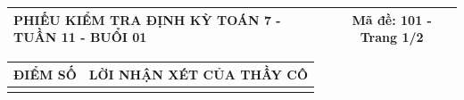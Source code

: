 \documentclass[12pt,a4paper]{article}
\begin{document}
\pagestyle{empty}
\noindent
\begin{tabularx}{\linewidth}{|X|c|}
\hline
\textbf{PHIẾU KIỂM TRA ĐỊNH KỲ TOÁN 7 - TUẦN 11 - BUỔI 01} & \textbf{Mã đề: 101 - Trang 1/2} \\
\hline
\end{tabularx}

\vspace{1.0mm}

\noindent
\begin{tabularx}{\linewidth}{|p{3.2cm}|X|}
\hline
\centering\textbf{ĐIỂM SỐ} & \centering\textbf{LỜI NHẬN XÉT CỦA THẦY CÔ} \tabularnewline
\hline
\rule{0pt}{1.8cm} & \tabularnewline
\hline
\end{tabularx}
\end{document}
